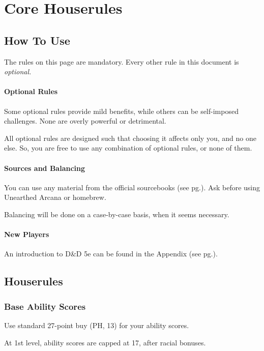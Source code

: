 \documentclass[letterpaper,twocolumn,openany,nodeprecatedcode]{dndbook}
\newcommand{\pg}[1]{pg.\pageref{#1}}
\newcommand{\see}[1]{(see \pg{#1})}
\begin{document}




\chapter{Core Houserules}

\noindent [Version 7.4.4]

\section{How To Use}
The rules on this page are mandatory. Every other rule in this document is \textit{optional.} 

\subsubsection{Optional Rules}
Some optional rules provide mild benefits, while others can be self-imposed challenges. None are overly powerful or detrimental. 

All optional rules are designed such that choosing it affects only you, and no one else. So, you are free to use any combination of optional rules, or none of them.

\subsubsection{Sources and Balancing}
You can use any material from the official sourcebooks \see{sources}. Ask before using Unearthed Arcana or homebrew.

Balancing will be done on a case-by-case basis, when it seems necessary. 

\subsubsection{New Players}
An introduction to D\&D 5e can be found in the Appendix \see{new-players-guide}.

\newpage
\section{Houserules}

\subsection{Base Ability Scores}
Use standard 27-point buy (PH, 13) for your ability scores. 

At 1st level, ability scores are capped at 17, after racial bonuses.
\end{document}

